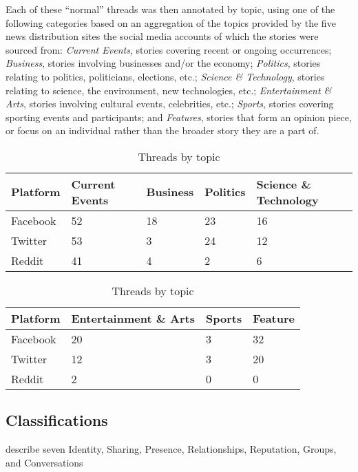 Each of these ``normal'' threads was then annotated by topic, using one of the following categories based on an aggregation of the topics provided by the five news distribution sites the social media accounts of which the stories were sourced from:
\textit{Current Events}, stories covering recent or ongoing occurrences;
\textit{Business}, stories involving businesses and/or the economy;
\textit{Politics}, stories relating to politics, politicians, elections, etc.;
\textit{Science \& Technology}, stories relating to science, the environment, new technologies, etc.;
\textit{Entertainment \& Arts}, stories involving cultural events, celebrities, etc.;
\textit{Sports}, stories covering sporting events and participants;
and \textit{Features}, stories that form an opinion piece, or focus on an individual rather than the broader story they are a part of.


\begin{table}
\centering
\caption{Threads by topic}
\label{table:perception:replies}
\begin{tabular}{ l | l | l | l | l}
\textbf{Platform} & \textbf{Current Events} & \textbf{Business} & \textbf{Politics} & \textbf{Science \& Technology} \\
\hline
Facebook & 52 & 18 & 23 & 16 \\
\hline
Twitter & 53 & 3 & 24 & 12\\
\hline
Reddit & 41 & 4 & 2 & 6\\
\end{tabular}
\newline
\newline
\begin{tabular}{ l | l | l | l}
\textbf{Platform} & \textbf{Entertainment \& Arts} & \textbf{Sports} & \textbf{Feature}\\
\hline
Facebook & 20 & 3 & 32 \\
\hline
Twitter & 12 & 3 & 20 \\
\hline
Reddit & 2 & 0 & 0 \\
\end{tabular}
\end{table}
 

\subsection{Classifications}


 \citet{kietzmann2011social} describe seven
Identity, Sharing, Presence, Relationships, Reputation, Groups, and Conversations



